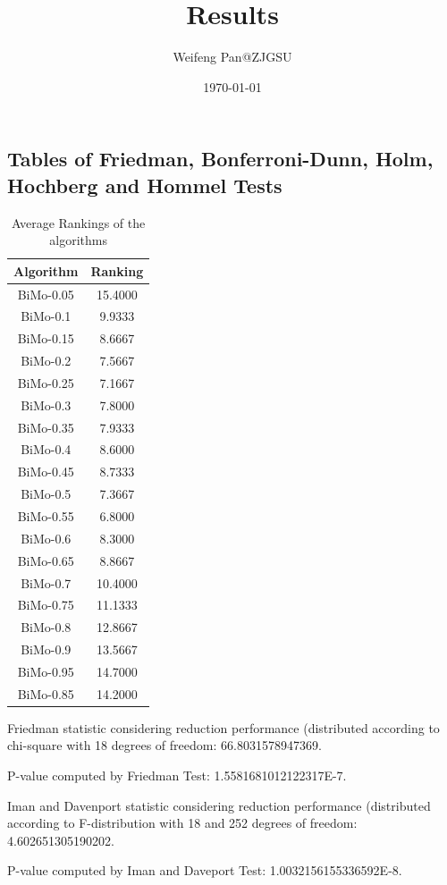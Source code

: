 \documentclass[a4paper,10pt]{article}
\title{Results}
\author{Weifeng Pan@ZJGSU}
\date{\today}
\begin{document}
\begin{landscape}
\oddsidemargin 0in \topmargin 0in\maketitle
\section{Tables of Friedman, Bonferroni-Dunn, Holm, Hochberg and Hommel Tests}
\begin{table}[!htp]
\centering
\caption{Average Rankings of the algorithms
}\begin{tabular}{c|c}
Algorithm&Ranking\\
\hline
BiMo-0.05&15.4000\\
BiMo-0.1&9.9333\\
BiMo-0.15&8.6667\\
BiMo-0.2&7.5667\\
BiMo-0.25&7.1667\\
BiMo-0.3&7.8000\\
BiMo-0.35&7.9333\\
BiMo-0.4&8.6000\\
BiMo-0.45&8.7333\\
BiMo-0.5&7.3667\\
BiMo-0.55&6.8000\\
BiMo-0.6&8.3000\\
BiMo-0.65&8.8667\\
BiMo-0.7&10.4000\\
BiMo-0.75&11.1333\\
BiMo-0.8&12.8667\\
BiMo-0.9&13.5667\\
BiMo-0.95&14.7000\\
BiMo-0.85&14.2000\\
\end{tabular}
\end{table}


Friedman statistic considering reduction performance (distributed according to chi-square with 18 degrees of freedom: 66.8031578947369.


P-value computed by Friedman Test: 1.5581681012122317E-7.\newline

Iman and Davenport statistic considering reduction performance (distributed according to F-distribution with 18 and 252 degrees of freedom: 4.602651305190202.


P-value computed by Iman and Daveport Test: 1.0032156155336592E-8.\newline


\end{landscape}
\end{document}
